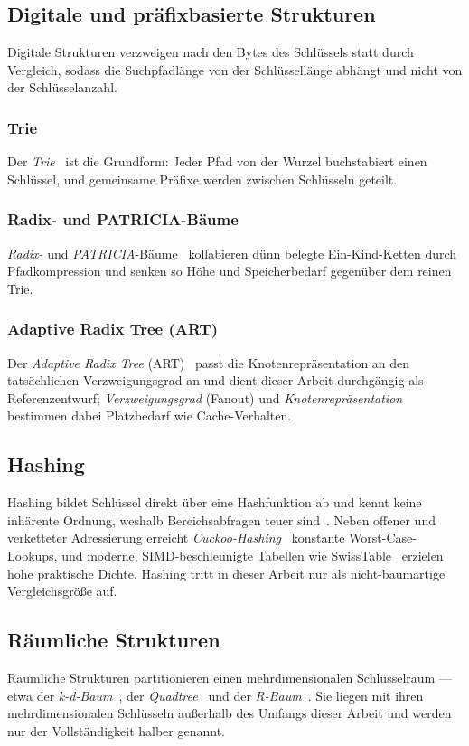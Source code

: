 \subsection{Digitale und präfixbasierte Strukturen}\label{ssec:digital}
Digitale Strukturen verzweigen nach den Bytes des Schlüssels statt durch Vergleich, sodass die
Suchpfadlänge von der Schlüssellänge abhängt und nicht von der Schlüsselanzahl.

\subsubsection{Trie}
Der \emph{Trie}~\cite{delabriandais1959trie,fredkin1960trie} ist die Grundform: Jeder Pfad von der
Wurzel buchstabiert einen Schlüssel, und gemeinsame Präfixe werden zwischen Schlüsseln geteilt.

\subsubsection{Radix- und PATRICIA-Bäume}
\emph{Radix-} und \emph{PATRICIA}-Bäume~\cite{morrison1968patricia} kollabieren dünn belegte
Ein-Kind-Ketten durch Pfadkompression und senken so Höhe und Speicherbedarf gegenüber dem reinen
Trie.

\subsubsection{Adaptive Radix Tree (ART)}
Der \emph{Adaptive Radix Tree} (ART)~\cite{leis2013art} passt die Knotenrepräsentation an den
tatsächlichen Verzweigungsgrad an und dient dieser Arbeit durchgängig als Referenzentwurf;
\emph{Verzweigungsgrad} (Fanout) und \emph{Knotenrepräsentation} bestimmen dabei Platzbedarf wie
Cache-Verhalten.

\subsection{Hashing}\label{ssec:hashing}
Hashing bildet Schlüssel direkt über eine Hashfunktion ab und kennt keine inhärente Ordnung, weshalb
Bereichsabfragen teuer sind~\cite{knuth1998taocp3}. Neben offener und verketteter Adressierung
erreicht \emph{Cuckoo-Hashing}~\cite{pagh2004cuckoo} konstante Worst-Case-Lookups, und moderne,
SIMD-beschleunigte Tabellen wie SwissTable~\cite{abseil_swisstable} erzielen hohe praktische Dichte.
Hashing tritt in dieser Arbeit nur als nicht-baumartige Vergleichsgröße auf.

\subsection{Räumliche Strukturen}\label{ssec:spatial}
Räumliche Strukturen partitionieren einen mehrdimensionalen Schlüsselraum --- etwa der
\emph{k-d-Baum}~\cite{bentley1975kdtree}, der \emph{Quadtree}~\cite{finkel1974quadtree} und der
\emph{R-Baum}~\cite{guttman1984rtree}. Sie liegen mit ihren mehrdimensionalen Schlüsseln außerhalb
des Umfangs dieser Arbeit und werden nur der Vollständigkeit halber genannt.

